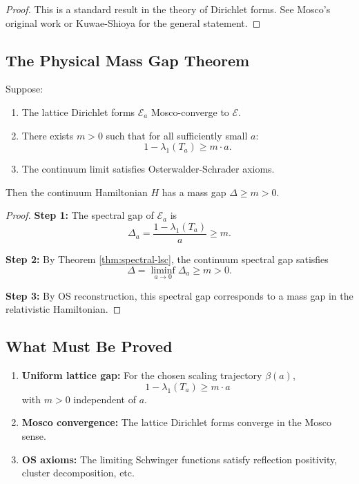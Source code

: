 \begin{proof}
This is a standard result in the theory of Dirichlet forms. See Mosco's original work or Kuwae-Shioya for the general statement.
\end{proof}

\subsection{The Physical Mass Gap Theorem}

\begin{theorem}\label{thm:continuum-mass-gap-app211}
Suppose:
\begin{enumerate}
    \item The lattice Dirichlet forms $\mathcal{E}_a$ Mosco-converge to $\mathcal{E}$.
    \item There exists $m > 0$ such that for all sufficiently small $a$:
    \begin{equation}
        1 - \lambda_1(T_a) \geq m \cdot a.
    \end{equation}
    \item The continuum limit satisfies Osterwalder-Schrader axioms.
\end{enumerate}
Then the continuum Hamiltonian $H$ has a mass gap $\Delta \geq m > 0$.
\end{theorem}

\begin{proof}
\textbf{Step 1:} The spectral gap of $\mathcal{E}_a$ is
\begin{equation}
    \Delta_a = \frac{1 - \lambda_1(T_a)}{a} \geq m.
\end{equation}

\textbf{Step 2:} By Theorem \ref{thm:spectral-lsc}, the continuum spectral gap satisfies
\begin{equation}
    \Delta = \liminf_{a \to 0} \Delta_a \geq m > 0.
\end{equation}

\textbf{Step 3:} By OS reconstruction, this spectral gap corresponds to a mass gap in the relativistic Hamiltonian.
\end{proof}

\subsection{What Must Be Proved}

\begin{enumerate}
    \item \textbf{Uniform lattice gap:} For the chosen scaling trajectory $\beta(a)$,
    \begin{equation}
        1 - \lambda_1(T_a) \geq m \cdot a
    \end{equation}
    with $m > 0$ independent of $a$.
    
    \item \textbf{Mosco convergence:} The lattice Dirichlet forms converge in the Mosco sense.
    
    \item \textbf{OS axioms:} The limiting Schwinger functions satisfy reflection positivity, cluster decomposition, etc.
\end{enumerate}

